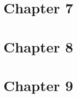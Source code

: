 \documentclass{wileySix}
\begin{document}
\chapter{Chapter 7}
%


%


\chapter{Chapter 8}






\chapter{Chapter 9}



 


\printindex



 
\end{document}
